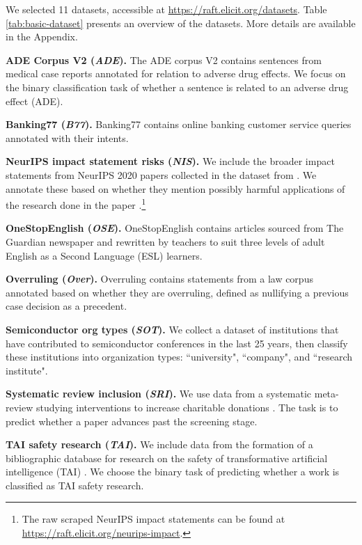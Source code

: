 \documentclass{article}
\newcommand{\datasetsURL}{\href{https://raft.elicit.org/datasets}{https://raft.elicit.org/datasets}}
\begin{document}
We selected 11 datasets, accessible at \datasetsURL{}. Table \ref{tab:basic-dataset} presents an overview of the datasets. More details are available in the Appendix.

\textbf{ADE Corpus V2 (\textit{ADE}).} The ADE corpus V2 \citep{GURULINGAPPA2012885} contains sentences from medical case reports annotated for relation to adverse drug effects. We focus on the binary classification task of whether a sentence is related to an adverse drug effect (ADE).



\textbf{Banking77 (\textit{B77}).} Banking77  \citep{casanueva2020efficient} contains online banking customer service queries annotated with their intents.



\textbf{NeurIPS impact statement risks (\textit{NIS}).} We include the broader impact statements from NeurIPS 2020 papers collected in the dataset from \citet{ashurst2021aiethics}. We annotate these based on whether they mention possibly harmful applications of the research done in the paper .\footnote{The raw scraped NeurIPS impact statements can be found at \href{https://raft.elicit.org/neurips-impact}{https://raft.elicit.org/neurips-impact}.}

\textbf{OneStopEnglish (\textit{OSE}).} OneStopEnglish \citep{vajjala-lucic-2018-onestopenglish} contains articles sourced from The Guardian newspaper and rewritten by teachers to suit three levels of adult English as a Second Language (ESL) learners.

\textbf{Overruling (\textit{Over}).} Overruling \citep{zheng2021does} contains statements from a law corpus annotated based on whether they are overruling, defined as nullifying a previous case decision as a precedent.

\textbf{Semiconductor org types (\textit{SOT}).} We collect a dataset of institutions that have contributed to semiconductor conferences in the last 25 years, then classify these institutions into organization types: ``university", ``company", and ``research institute".

\textbf{Systematic review inclusion (\textit{SRI}).} We use data from a systematic meta-review studying interventions to increase charitable donations \citep{noetel_slattery_saeri_lee_houlden_farr_gelber_stone_huuskes_timmons_2020}. The task is to predict whether a paper advances past the screening stage.

\textbf{TAI safety research (\textit{TAI}).} We include data from the formation of a bibliographic database for research on the safety of transformative artificial intelligence (TAI) \citep{riedel_deibel_2020}. We choose the binary task of predicting whether a work is classified as TAI safety research.
\end{document}
